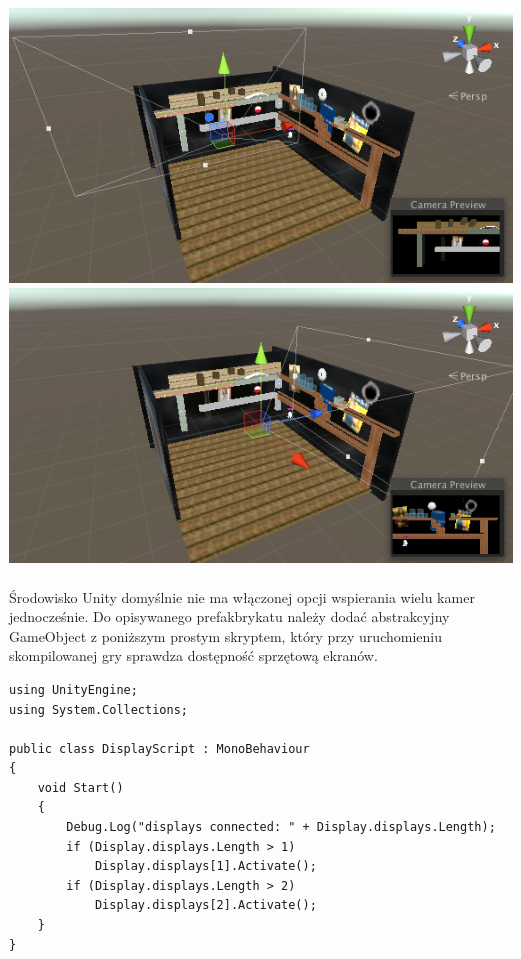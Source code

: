 \begin{center}
\includegraphics[width=1\textwidth]{images/kamera1.png}
\includegraphics[width=1\textwidth]{images/kamera2.png}
\end{center}

\paragraph{}
Środowisko Unity domyślnie nie ma włączonej opcji wspierania wielu kamer jednocześnie. Do opisywanego prefakbrykatu należy dodać abstrakcyjny GameObject z poniższym prostym skryptem, który przy uruchomieniu skompilowanej gry sprawdza dostępność sprzętową ekranów.

\begin{lstlisting}[language=CSharp]
using UnityEngine;
using System.Collections;

public class DisplayScript : MonoBehaviour
{
	void Start()
	{
		Debug.Log("displays connected: " + Display.displays.Length);
		if (Display.displays.Length > 1)
			Display.displays[1].Activate();
		if (Display.displays.Length > 2)
			Display.displays[2].Activate();
	}
}
\end{lstlisting}

